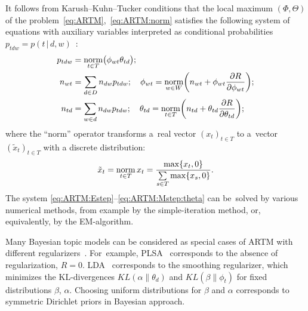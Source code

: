 \documentclass{acm_proc_article-sp}
\newcommand{\norm}{\mathop{\rm norm}\limits}
\newcommand{\cond}{\mspace{3mu}{|}\mspace{3mu}}
\begin{document}
It follows from Karush--Kuhn--Tucker conditions
that the \mbox{local} maximum $(\Phi,\Theta)$
of the problem~\eqref{eq:ARTM},~\eqref{eq:ARTM:norm}
satisfies the following system of equations
with auxiliary variables interpreted as conditional probabilities
${p_{tdw} = p(t\cond d,w)}$~\cite{voron14aist}:
\begin{align}
    \label{eq:ARTM:Estep}
    p_{tdw} &= \norm_{t\in T} \bigl(\phi_{wt}\theta_{td}\bigr);
\\
    \label{eq:ARTM:Mstep:phi}
    n_{wt} &= \sum_{d\in D} n_{dw} p_{tdw};\quad
    \phi_{wt} = \norm_{w\in W}
        \biggl(
            n_{wt} + \phi_{wt} \frac{\partial R}{\partial \phi_{wt}}
        \biggr);
\\
    \label{eq:ARTM:Mstep:theta}
    n_{td} &= \sum_{w\in d} n_{dw} p_{tdw};\quad
    \theta_{td} = \norm_{t\in T}
        \biggl(
            n_{td} + \theta_{td} \frac{\partial R}{\partial \theta_{td}}
        \biggr);
\end{align}
where the ``norm'' operator transforms
a~real vector $(x_t)_{t\in T}$ to
a~vector $(\tilde x_t)_{t\in T}$ with a discrete distribution:
\[
    \tilde x_t = \norm_{t\in T} x_t = \frac{\max\{x_t,0\}}{\sum\limits_{s\in T} \max\{x_s,0\}}.
\]
The system \eqref{eq:ARTM:Estep}--\eqref{eq:ARTM:Mstep:theta}
can be~solved by various numerical methods,
from example by the simple-iteration method,
or, equivalently, by the EM-algorithm.

Many Bayesian topic models can be considered
as special cases of ARTM with different regularizers~\cite{voron14aist,voron14mlj}.
For~example,
PLSA~\cite{hofmann99plsi} corresponds to the absence of regularization, ${R=0}$.
LDA~\cite{blei03latent} corresponds to the smoothing regularizer,
which minimizes the KL-divergences
$KL(\alpha\|\theta_d)$ and
$KL(\beta\|\phi_t)$
for fixed distributions $\beta$, $\alpha$.
Choosing uniform distributions for $\beta$ and $\alpha$
corresponds to symmetric Dirichlet priors in Bayesian approach.
\end{document}
